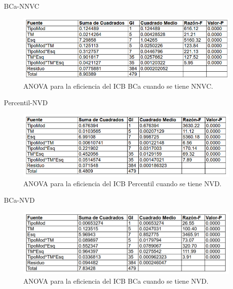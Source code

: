 BCa-NNVC

\begin{figure}[ht] 
	\centering 
	\includegraphics[width=0.95\linewidth]{img/ANOVA_Efic_ICB_BCa_NNVC.png} 
	\caption{ANOVA para la eficiencia del ICB BCa cuando se tiene NNVC.} 
	\label{fig:ANOVA_Efic_ICB_BCa_NNVC}
\end{figure}
\FloatBarrier






Percentil-NVD

\begin{figure}[ht] 
	\centering 
	\includegraphics[width=0.95\linewidth]{img/ANOVA_Efic_ICB_Perc_NVD.png} 
	\caption{ANOVA para la eficiencia del ICB Percentil cuando se tiene NVD.} 
	\label{fig:ANOVA_Efic_ICB_Perc_NVD}
\end{figure}
\FloatBarrier






BCa-NVD

\begin{figure}[ht] 
	\centering 
	\includegraphics[width=0.95\linewidth]{img/ANOVA_Efic_ICB_BCa_NVD.png} 
	\caption{ANOVA para la eficiencia del ICB BCa cuando se tiene NVD.} 
	\label{fig:ANOVA_Efic_ICB_BCa_NVD}
\end{figure}
\FloatBarrier




